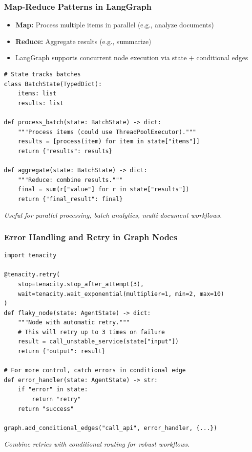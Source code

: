 \documentclass[aspectratio=169,11pt]{beamer}
\begin{document}
\begin{frame}[fragile]
\frametitle{Map-Reduce Patterns in LangGraph}
\begin{itemize}
    \setlength{\itemsep}{1pt}
  \item \textbf{Map:} Process multiple items in parallel (e.g., analyze documents)
  \item \textbf{Reduce:} Aggregate results (e.g., summarize)
  \item LangGraph supports concurrent node execution via state + conditional edges
\end{itemize}

\vspace{10pt}
\begin{lstlisting}
# State tracks batches
class BatchState(TypedDict):
    items: list
    results: list

def process_batch(state: BatchState) -> dict:
    """Process items (could use ThreadPoolExecutor)."""
    results = [process(item) for item in state["items"]]
    return {"results": results}

def aggregate(state: BatchState) -> dict:
    """Reduce: combine results."""
    final = sum(r["value"] for r in state["results"])
    return {"final_result": final}
\end{lstlisting}

\textit{Useful for parallel processing, batch analytics, multi-document workflows.}
\end{frame}

\begin{frame}[fragile]
\frametitle{Error Handling and Retry in Graph Nodes}
\begin{lstlisting}
import tenacity

@tenacity.retry(
    stop=tenacity.stop_after_attempt(3),
    wait=tenacity.wait_exponential(multiplier=1, min=2, max=10)
)
def flaky_node(state: AgentState) -> dict:
    """Node with automatic retry."""
    # This will retry up to 3 times on failure
    result = call_unstable_service(state["input"])
    return {"output": result}

# For more control, catch errors in conditional edge
def error_handler(state: AgentState) -> str:
    if "error" in state:
        return "retry"
    return "success"

graph.add_conditional_edges("call_api", error_handler, {...})
\end{lstlisting}

\vspace{10pt}
\textit{Combine retries with conditional routing for robust workflows.}
\end{frame}
\end{document}
